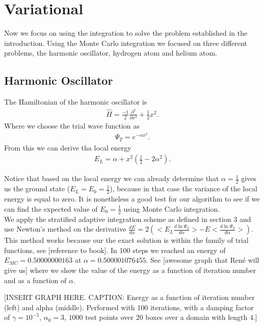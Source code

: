 
\section{Variational}
 Now we focus on using the integration to solve the problem established in the introduction.
 Using the Monte Carlo integration we focused on three different problems, the harmonic oscillator,
 hydrogen atom and helium atom.

\subsection{Harmonic Oscillator}
The Hamiltonian of the harmonic oscillator is
\begin{align*}
  \hat{H} = \frac{-1}{2}\frac{\partial^2}{ \partial x^2} + \frac{1}{2} x^2.
\end{align*}
Where we choose the trial wave function as
  \begin{align*}
    \Psi_T = e^{-\alpha x^2}.
  \end{align*}
From this we can derive tha local energy
  \begin{align*}
    E_L = \alpha + x^2(\frac{1}{2} - 2\alpha^2).
  \end{align*}
 	
  Notice that based on the local energy we can already determine that $\alpha = \frac{1}{2}$ gives us the ground state ($E_L = E_0 = \frac{1}{2}$), because in that case the variance of the local energy is equal to zero. It is nonetheless a good test for our algorithm to see if we can find the expected value of $E_0 = \frac{1}{2}$ using Monte Carlo integration.  \\
  
We apply the stratified adaptive integration scheme as defined in section 3 and use Newton's method on the derivative $\frac{dE}{d\alpha} = 2 (<E_L \frac{d \ln \Psi_T}{d \alpha}> - E<\frac{d \ln \Psi_T}{d \alpha}>)$. This method works because our the exact solution is within the family of trial functions, see [reference to book]. In 100 steps we reached an energy of $E_{MC} = 0.50000000163$ at $\alpha = 0.500001076455$.  See [awesome graph that Ren\'e will give us] where we show the value of the energy as a function of iteration number and as a function of $\alpha$. 

[INSERT GRAPH HERE. CAPTION: Energy as a function of iteration number (left) and alpha (middle). Performed with 100 iterations, with a damping factor of $\gamma = 10^{-5}$, $\alpha_0 = 3$, $1000$ test points over $20$ boxes over a domain with length $4$.] 
  

